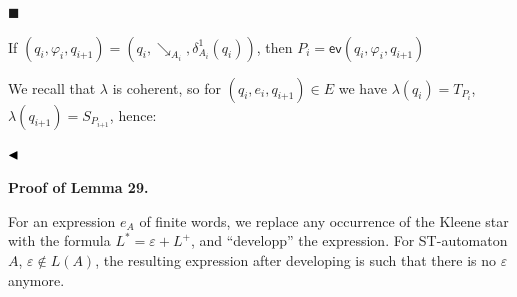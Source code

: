 \documentclass[10pt,a4paper]{article}
\begin{document}
 
 
\par\noindent  $\blacksquare$ 
 
If $(q_{i},\varphi_{i},q_{i\text{+}1})=(q_{i},\mathrel{\searrow_{A_{i}}},\delta_{A_{i}}^{1}(q_{i}))$, then $P_{i}=\mathsf{ev}(q_{i},\varphi_{i},q_{i\text{+}1})$\par
 
 
  
We recall that $\lambda$ is coherent, so for $(q_{i},e_{i},q_{i\text{+}1})\in E$ we have $\lambda(q_{i})=T_{P_{i}}$, $\lambda(q_{i\text{+}1})=S_{P_{i\text{+}1}}$, hence:\par
 
 
 
\begin{center}\end{center}
 
$\hfill\blacktriangleleft$\par
 
 
 
 
\par\medskip\noindent\textbf{Proof of Lemma 29.}\par
 
 
For an expression $e_{A}$ of finite words, we replace any occurrence of the Kleene star with the formula $L^{*}=\varepsilon+L^{+}$, and “developp” the expression. For ST-automaton $A$, $\varepsilon\not\in L(A)$, the resulting expression after developing is such that there is no $\varepsilon$ anymore.\par
 
 
\end{document}
